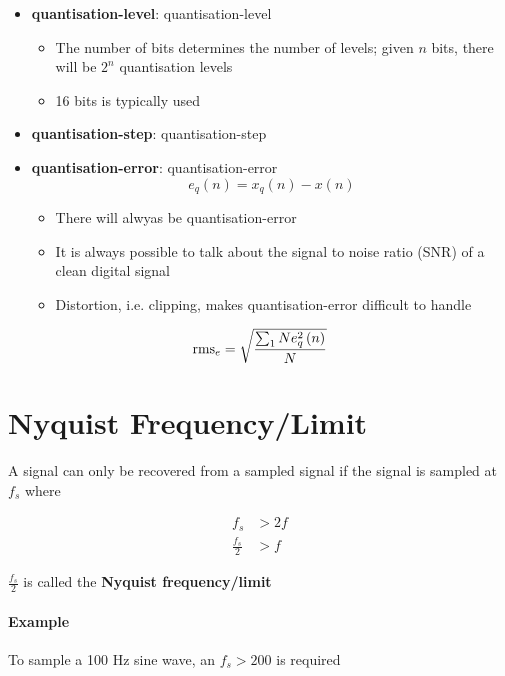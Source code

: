     \begin{itemize}
      \item \textbf{\Gls{quantisation-level}}: \glsdesc{quantisation-level}
      \begin{itemize}
        \item The number of bits determines the number of levels; given $ n $
        bits, there will be $ 2^{n} $ quantisation levels
        \item 16 bits is typically used
      \end{itemize}

      \item \textbf{\Gls{quantisation-step}}: \glsdesc{quantisation-step}
      \item \textbf{\Gls{quantisation-error}}: \glsdesc{quantisation-error}
      \begin{equation}
        e_{q}\left( n \right) = x_{q}\left( n \right) - x\left( n \right)
      \end{equation}
      \begin{itemize}
        \item There will alwyas be \gls{quantisation-error}
        \item It is always possible to talk about the signal to noise ratio
        (SNR) of a clean digital signal
        \item Distortion, i.e. clipping, makes \gls{quantisation-error}
        difficult to handle
      \end{itemize}
    \end{itemize}

    \begin{equation}
      \operatorname{rms}_{e} = \sqrt{\frac{\sum_{1}{N} e_{q}^{2}\left( n \right)}{N}}
    \end{equation}

\section{Nyquist Frequency/Limit}

  A signal can only be recovered from a sampled signal if the signal is
  sampled at $ f_{s} $ where

  \begin{align}
    f_{s} &> 2 f \\
    \frac{f_{s}}{2} &> f
  \end{align}

  $ \frac{f_{s}}{2} $ is called the \textbf{Nyquist frequency/limit}

  \paragraph{Example}
  To sample a 100 Hz sine wave, an $ f_{s} > 200 $ is required

